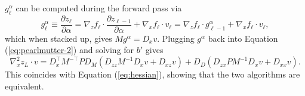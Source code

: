 \documentclass{article}
\begin{document}
$g^\alpha_\ell$ can be computed during the forward pass via
\begin{equation}
  g^\alpha_\ell \equiv \frac{\partial z_\ell}{\partial \alpha}
  = \nabla_z f_\ell \cdot \frac{\partial z_{\ell-1}}{\partial \alpha} + \nabla_x f_\ell \cdot v_\ell
  = \nabla_z f_\ell \cdot g^\alpha_{\ell-1} + \nabla_x f_\ell \cdot v_\ell,
\end{equation}
which when stacked up, gives $M g^\alpha = D_x v$.  Plugging $g^\alpha$ back
into Equation (\ref{eq:pearlmutter-2}) and solving for $b'$ gives
\begin{equation}
  \nabla_x^2 z_L \cdot v = D_x^\top M^{-\top} P D_M  \left(D_{zz} M^{-1} D_x v + D_{xz} v\right) +  D_D \left(D_{zx} P M^{-1} D_x v + D_{xx} v\right).
\end{equation}
This coincides with Equation (\ref{eq:hessian}), showing that the two algorithms are equivalent.
\end{document}
